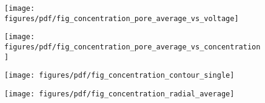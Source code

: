 \begin{figure*}[htbp]
\centering
\begin{minipage}[t]{5cm}
\begin{subfigure}[t]{5cm}
	\centering
	\caption{}\label{fig:concentration_pore_average_vs_voltage}
	\texttt{[image: figures/pdf/fig\_concentration\_pore\_average\_vs\_voltage]}
\end{subfigure}

\begin{subfigure}[t]{5cm}
	\centering
	\caption{}\label{fig:concentration_pore_average_vs_concentration}
	\texttt{[image: figures/pdf/fig\_concentration\_pore\_average\_vs\_concentration]}
\end{subfigure}
\end{minipage}
\hspace{0.5cm}
\begin{minipage}[t]{10cm}
\begin{subfigure}[t]{6cm}
	\centering
	\caption{}\label{fig:concentration_contour}
	\texttt{[image: figures/pdf/fig\_concentration\_contour\_single]}
\end{subfigure}
\hspace{-0.5cm}
\begin{subfigure}[t]{4cm}
	\centering
	\caption{}\label{fig:concentration_radial_average}
	\texttt{[image: figures/pdf/fig\_concentration\_radial\_average]}
\end{subfigure}
\end{minipage}




\newcommand{\bluesolid}{\raisebox{2pt}{\tikz{\draw[-,blue,solid,line width = 1pt](0,0) -- (5mm,0);}}}
\newcommand{\orangesolid}{\raisebox{2pt}{\tikz{\draw[-,orange,solid,line width = 1pt](0,0) -- (5mm,0);}}}
\newcommand{\greensolid}{\raisebox{2pt}{\tikz{\draw[-,green,solid,line width = 1pt](0,0) -- (5mm,0);}}}
\newcommand{\redsolid}{\raisebox{2pt}{\tikz{\draw[-,red,solid,line width = 1pt](0,0) -- (5mm,0);}}}
\newcommand{\purplesolid}{\raisebox{2pt}{\tikz{\draw[-,purple,solid,line width = 1pt](0,0) -- (5mm,0);}}}
\newcommand{\brownsolid}{\raisebox{2pt}{\tikz{\draw[-,brown,solid,line width = 1pt](0,0) -- (5mm,0);}}}


\end{figure*}
